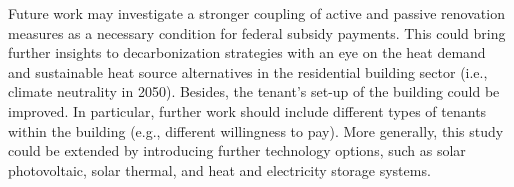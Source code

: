 Future work may investigate a stronger coupling of active and passive renovation measures as a necessary condition for federal subsidy payments. This could bring further insights to decarbonization strategies with an eye on the heat demand and sustainable heat source alternatives in the residential building sector (i.e., climate neutrality in 2050). Besides, the tenant's set-up of the building could be improved. In particular, further work should include different types of tenants within the building (e.g., different willingness to pay). More generally, this study could be extended by introducing further technology options, such as solar photovoltaic, solar thermal, and heat and electricity storage systems. 